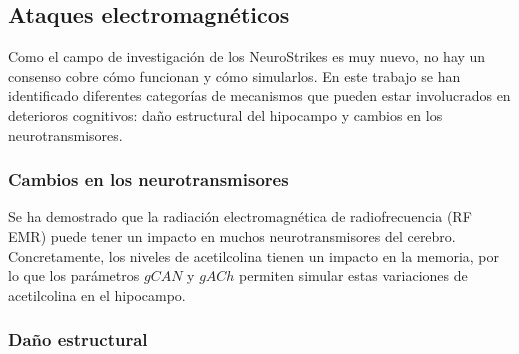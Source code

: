 \documentclass[12pt, letterpaper]{article}
\begin{document}
\subsection{Ataques electromagnéticos}
Como el campo de investigación de los NeuroStrikes es muy nuevo, no hay un consenso cobre cómo funcionan y cómo simularlos. En este trabajo se han identificado diferentes categorías de mecanismos que pueden estar involucrados en deterioros cognitivos: daño estructural del hipocampo y cambios en los neurotransmisores.

\subsubsection{Cambios en los neurotransmisores}
Se ha demostrado que la radiación electromagnética de radiofrecuencia (RF EMR) puede tener un impacto en muchos neurotransmisores del cerebro. Concretamente, los niveles de acetilcolina tienen un impacto en la memoria, por lo que los parámetros $gCAN$ y $gACh$ permiten simular estas variaciones de acetilcolina en el hipocampo.

\subsubsection{Daño estructural}
\end{document}
